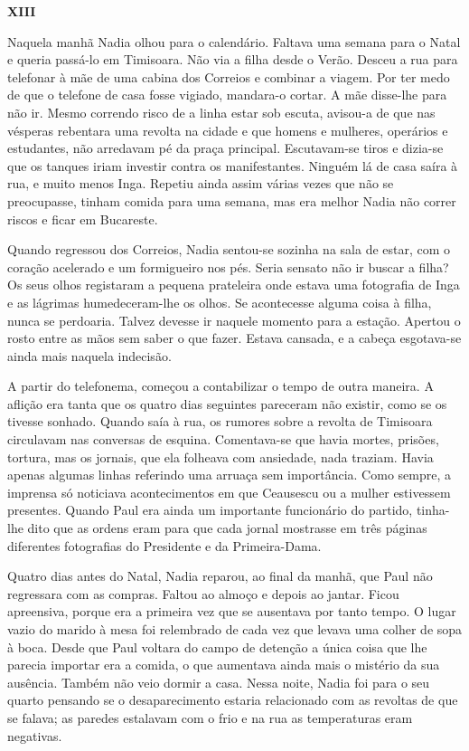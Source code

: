 \pagebreak
\vspace*{1.8cm}
\noindent{}\textbf{XIII}

\bigskip

Naquela manhã Nadia olhou para o calendário. Faltava uma semana para o
Natal e queria passá-lo em Timisoara. Não via a filha desde o Verão.
Desceu a rua para telefonar à mãe de uma cabina dos Correios e combinar
a viagem. Por ter medo de que o telefone de casa fosse vigiado,
mandara-o cortar. A mãe disse-lhe para não ir. Mesmo correndo risco de a
linha estar sob escuta, avisou-a de que nas vésperas rebentara uma
revolta na cidade e que homens e mulheres, operários e estudantes, não
arredavam pé da praça principal. Escutavam-se tiros e dizia-se que os
tanques iriam investir contra os manifestantes. Ninguém lá de casa saíra
à rua, e muito menos Inga. Repetiu ainda assim várias vezes que não se
preocupasse, tinham comida para uma semana, mas era melhor Nadia não
correr riscos e ficar em Bucareste.

Quando regressou dos Correios, Nadia sentou-se sozinha na sala de estar, com o coração acelerado e um formigueiro nos
pés. Seria sensato não ir buscar a filha? Os seus olhos registaram a
pequena prateleira onde estava uma fotografia de Inga e as lágrimas
humedeceram-lhe os
olhos. Se acontecesse alguma coisa à filha, nunca se perdoaria. Talvez
devesse ir naquele momento para a estação. Apertou o rosto entre as mãos
sem saber o que fazer. Estava cansada, e a cabeça esgotava-se ainda mais
naquela indecisão.

A partir do telefonema, começou a contabilizar o tempo de outra maneira.
A aflição era tanta que os quatro dias seguintes pareceram não existir,
como se os tivesse sonhado. Quando saía à rua, os rumores sobre a
revolta de Timisoara circulavam nas conversas de esquina. Comentava-se
que havia mortes, prisões, tortura, mas os jornais, que ela folheava com
ansiedade, nada traziam. Havia apenas algumas linhas referindo uma
arruaça sem importância. Como sempre, a imprensa só noticiava acontecimentos em que Ceausescu ou a mulher estivessem presentes. Quando
Paul era ainda um importante funcionário do partido, tinha-lhe dito
que as ordens eram para que cada jornal mostrasse em três páginas
diferentes fotografias do Presidente e da Primeira-Dama.

Quatro dias antes do Natal, Nadia reparou, ao final da
manhã, que Paul não regressara com as compras. Faltou ao almoço e depois
ao jantar. Ficou apreensiva, porque era a primeira vez que se ausentava
por tanto tempo. O lugar vazio do marido à mesa foi relembrado de cada
vez que levava uma colher de sopa à boca. Desde que Paul voltara do
campo de detenção a única coisa que lhe parecia importar era a comida,
o que aumentava ainda mais o mistério da sua ausência. Também não veio
dormir a casa. Nessa noite, Nadia foi para o seu quarto pensando se o
desaparecimento estaria relacionado com as revoltas de que se
falava; as paredes estalavam com o frio e na rua as temperaturas eram
negativas.


